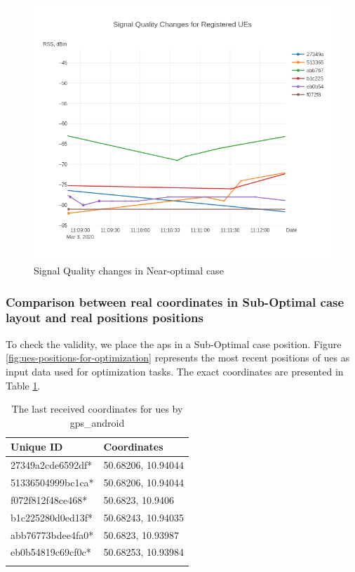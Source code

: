 \begin{figure}[H]
	\centering
	\includegraphics[width=0.7\linewidth,keepaspectratio]{images/Exp4_Near_Optimal.png}
	\caption{Signal Quality changes in Near-optimal case}
	\label{fig:signal-quality-changes-near-optimal}
\end{figure}

\subsubsection{Comparison between real coordinates in Sub-Optimal case layout and real positions
	positions}

To check the validity, we place the \glspl{ap} in a Sub-Optimal case position. Figure \ref{fig:ues-positions-for-optimization} represents the most recent positions  of \glspl{ue} as input data used for optimization tasks. The exact coordinates are presented in Table \ref{tab:exp4-sub-optimal-last-received-coordinates-ues}.

\begin{longtable}[]{@{}ll@{}}
	\caption{The last received coordinates for \glspl{ue} by \gls{gps_android}}\tabularnewline
	\toprule
	Unique ID & Coordinates\tabularnewline
	\midrule
	\endhead
	27349a2cde6592df* & 50.68206, 10.94044\tabularnewline
	51336504999bc1ca* & 50.68206, 10.94044\tabularnewline
	f072f812f48ce468* & 50.6823, 10.9406\tabularnewline
	b1c225280d0ed13f* & 50.68243, 10.94035\tabularnewline
	abb76773bdee4fa0* & 50.6823, 10.93987\tabularnewline
	eb0b54819c69cf0c* & 50.68253, 10.93984\tabularnewline
	\bottomrule
	\label{tab:exp4-sub-optimal-last-received-coordinates-ues}
\end{longtable}


